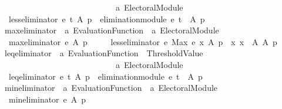 \begin{isabellebody}
\ \ \ \ \ \ \ \ \ \ \ \ \ \ \ \ \ \ \ \ \ \ \ \ \ \ \ \ {\isacharprime}{\kern0pt}a\ Electoral{\isacharunderscore}{\kern0pt}Module{\isachardoublequoteclose}\ \isanewline
\ \ {\isachardoublequoteopen}less{\isacharunderscore}{\kern0pt}eliminator\ e\ t\ A\ p\ {\isacharequal}{\kern0pt}\ elimination{\isacharunderscore}{\kern0pt}module\ e\ t\ {\isacharparenleft}{\kern0pt}{\isacharless}{\kern0pt}{\isacharparenright}{\kern0pt}\ A\ p{\isachardoublequoteclose}\isanewline
\isanewline
{}\isamarkupfalse%
\ max{\isacharunderscore}{\kern0pt}eliminator\ {\isacharcolon}{\kern0pt}{\isacharcolon}{\kern0pt}\ {\isachardoublequoteopen}{\isacharprime}{\kern0pt}a\ Evaluation{\isacharunderscore}{\kern0pt}Function\ {\isasymRightarrow}\ {\isacharprime}{\kern0pt}a\ Electoral{\isacharunderscore}{\kern0pt}Module{\isachardoublequoteclose}\ \isanewline
\ \ {\isachardoublequoteopen}max{\isacharunderscore}{\kern0pt}eliminator\ e\ A\ p\ {\isacharequal}{\kern0pt}\isanewline
\ \ \ \ less{\isacharunderscore}{\kern0pt}eliminator\ e\ {\isacharparenleft}{\kern0pt}Max\ {\isacharbraceleft}{\kern0pt}e\ x\ A\ p\ {\isacharbar}{\kern0pt}\ x{\isachardot}{\kern0pt}\ x\ {\isasymin}\ A{\isacharbraceright}{\kern0pt}{\isacharparenright}{\kern0pt}\ A\ p{\isachardoublequoteclose}\isanewline
\isanewline
{}\isamarkupfalse%
\ leq{\isacharunderscore}{\kern0pt}eliminator\ {\isacharcolon}{\kern0pt}{\isacharcolon}{\kern0pt}\ {\isachardoublequoteopen}{\isacharprime}{\kern0pt}a\ Evaluation{\isacharunderscore}{\kern0pt}Function\ {\isasymRightarrow}\ Threshold{\isacharunderscore}{\kern0pt}Value\ {\isasymRightarrow}\isanewline
\ \ \ \ \ \ \ \ \ \ \ \ \ \ \ \ \ \ \ \ \ \ \ \ \ \ \ \ {\isacharprime}{\kern0pt}a\ Electoral{\isacharunderscore}{\kern0pt}Module{\isachardoublequoteclose}\ \isanewline
\ \ {\isachardoublequoteopen}leq{\isacharunderscore}{\kern0pt}eliminator\ e\ t\ A\ p\ {\isacharequal}{\kern0pt}\ elimination{\isacharunderscore}{\kern0pt}module\ e\ t\ {\isacharparenleft}{\kern0pt}{\isasymle}{\isacharparenright}{\kern0pt}\ A\ p{\isachardoublequoteclose}\isanewline
\isanewline
{}\isamarkupfalse%
\ min{\isacharunderscore}{\kern0pt}eliminator\ {\isacharcolon}{\kern0pt}{\isacharcolon}{\kern0pt}\ {\isachardoublequoteopen}{\isacharprime}{\kern0pt}a\ Evaluation{\isacharunderscore}{\kern0pt}Function\ {\isasymRightarrow}\ {\isacharprime}{\kern0pt}a\ Electoral{\isacharunderscore}{\kern0pt}Module{\isachardoublequoteclose}\ \isanewline
\ \ {\isachardoublequoteopen}min{\isacharunderscore}{\kern0pt}eliminator\ e\ A\ p\ {\isacharequal}{\kern0pt}\isanewline

\end{isabellebody}
